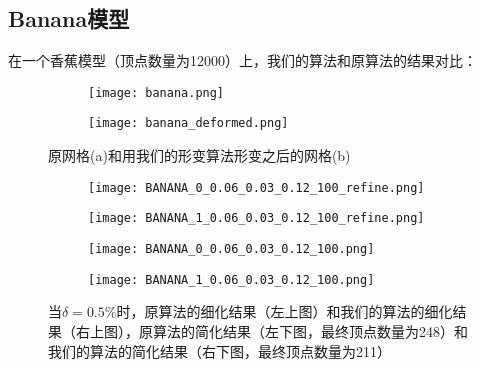 \subsection{Banana模型}
在一个香蕉模型（顶点数量为12000）上，我们的算法和原算法的结果对比：
\begin{figure}[H]
  \centering
  \begin{subfigure}[b]{0.4\textwidth}
    \texttt{[image: banana.png]}
    \end{subfigure}
    \begin{subfigure}[b]{0.4\textwidth}
      \texttt{[image: banana\_deformed.png]}
    \end{subfigure}
    \caption[banana形变结果]{原网格(a)和用我们的形变算法形变之后的网格(b)}
    \label{fig:banana-deform}
\end{figure}

\begin{figure}[H]
  \centering
  \begin{subfigure}[b]{0.4\textwidth}
    \texttt{[image: BANANA\_0\_0.06\_0.03\_0.12\_100\_refine.png]}
  \end{subfigure}
  \begin{subfigure}[b]{0.4\textwidth}
    \texttt{[image: BANANA\_1\_0.06\_0.03\_0.12\_100\_refine.png]}
  \end{subfigure}
  \begin{subfigure}[b]{0.4\textwidth}
    \texttt{[image: BANANA\_0\_0.06\_0.03\_0.12\_100.png]}
  \end{subfigure}
  \begin{subfigure}[b]{0.4\textwidth}
    \texttt{[image: BANANA\_1\_0.06\_0.03\_0.12\_100.png]}
  \end{subfigure}
  \caption[当$\delta=0.5\%$时banana结果对比]{当$\delta=0.5\%$时，原算法的细化结果（左上图）和我们的算法的细化结果（右上图），原算法的简化结果（左下图，最终顶点数量为248）和我们的算法的简化结果（右下图，最终顶点数量为211）}
  \label{fig:banana-res1}
\end{figure}

